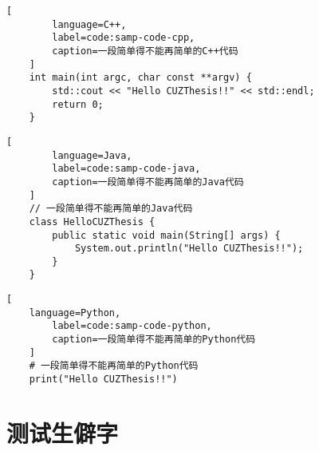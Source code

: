 \begin{appendices}
\begin{lstlisting}[
        language=C++,
        label=code:samp-code-cpp,
        caption=一段简单得不能再简单的C++代码
    ]
    int main(int argc, char const **argv) {
        std::cout << "Hello CUZThesis!!" << std::endl;
        return 0;
    }
    \end{lstlisting}

	\begin{lstlisting}[
        language=Java,
        label=code:samp-code-java,
        caption=一段简单得不能再简单的Java代码
    ]
    // 一段简单得不能再简单的Java代码
    class HelloCUZThesis {
        public static void main(String[] args) {
            System.out.println("Hello CUZThesis!!");
        }
    }
    \end{lstlisting}

	\begin{lstlisting}[
    language=Python,
        label=code:samp-code-python,
        caption=一段简单得不能再简单的Python代码
    ]
    # 一段简单得不能再简单的Python代码
    print("Hello CUZThesis!!")
    \end{lstlisting}




	\section*{测试生僻字} \label{sec:testcharacters}


\end{appendices}
